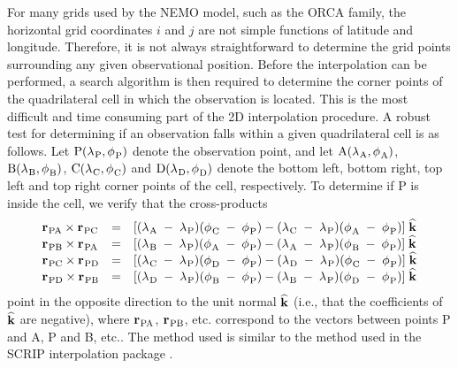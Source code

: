 \documentclass[NEMO_book]{subfiles}
\begin{document}
For many grids used by the NEMO model, such as the ORCA family, 
the horizontal grid coordinates $i$ and $j$ are not simple functions 
of latitude and longitude. Therefore, it is not always straightforward 
to determine the grid points surrounding any given observational position.
Before the interpolation can be performed, a search 
algorithm is then required to determine the corner points of 
the quadrilateral cell in which the observation is located.
This is the most difficult and time consuming part of the 
2D interpolation procedure. 
A robust test for determining if an observation falls
within a given quadrilateral cell is as follows. Let 
${\rm P}({\lambda_{}}_{\rm P} ,{\phi_{}}_{\rm P} )$ denote the observation point,
and let ${\rm A}({\lambda_{}}_{\rm A} ,{\phi_{}}_{\rm A} )$,
${\rm B}({\lambda_{}}_{\rm B} ,{\phi_{}}_{\rm B} )$,
${\rm C}({\lambda_{}}_{\rm C} ,{\phi_{}}_{\rm C} )$ 
and 
${\rm D}({\lambda_{}}_{\rm D} ,{\phi_{}}_{\rm D} )$ denote
the bottom left, bottom right, top left and top right
corner points of the cell, respectively. 
To determine if P is inside 
the cell, we verify that the cross-products 
\begin{eqnarray}
\begin{array}{lllll}
{{\bf r}_{}}_{\rm PA} \times {{\bf r}_{}}_{\rm PC}
& = & [({\lambda_{}}_{\rm A}\; -\; {\lambda_{}}_{\rm P} )
      ({\phi_{}}_{\rm C}   \; -\; {\phi_{}}_{\rm P} )
    - ({\lambda_{}}_{\rm C}\; -\; {\lambda_{}}_{\rm P} )
      ({\phi_{}}_{\rm A}   \; -\; {\phi_{}}_{\rm P} )] \; \widehat{\bf k} \\
{{\bf r}_{}}_{\rm PB} \times {{\bf r}_{}}_{\rm PA}
& = & [({\lambda_{}}_{\rm B}\; -\; {\lambda_{}}_{\rm P} )
      ({\phi_{}}_{\rm A}   \; -\; {\phi_{}}_{\rm P} )
    - ({\lambda_{}}_{\rm A}\; -\; {\lambda_{}}_{\rm P} )
      ({\phi_{}}_{\rm B}   \; -\; {\phi_{}}_{\rm P} )] \; \widehat{\bf k} \\
{{\bf r}_{}}_{\rm PC} \times {{\bf r}_{}}_{\rm PD}
& = & [({\lambda_{}}_{\rm C}\; -\; {\lambda_{}}_{\rm P} )
      ({\phi_{}}_{\rm D}   \; -\; {\phi_{}}_{\rm P} )
    - ({\lambda_{}}_{\rm D}\; -\; {\lambda_{}}_{\rm P} )
      ({\phi_{}}_{\rm C}   \; -\; {\phi_{}}_{\rm P} )] \; \widehat{\bf k} \\
{{\bf r}_{}}_{\rm PD} \times {{\bf r}_{}}_{\rm PB}
& = & [({\lambda_{}}_{\rm D}\; -\; {\lambda_{}}_{\rm P} )
      ({\phi_{}}_{\rm B}   \; -\; {\phi_{}}_{\rm P} )
    - ({\lambda_{}}_{\rm B}\; -\; {\lambda_{}}_{\rm P} )
      ({\phi_{}}_{\rm D}  \;  - \; {\phi_{}}_{\rm P} )] \; \widehat{\bf k} \\
\end{array}
\label{eq:cross}
\end{eqnarray}
point in the opposite direction to the unit normal 
$\widehat{\bf k}$ (i.e., that the coefficients of 
$\widehat{\bf k}$ are negative),
where ${{\bf r}_{}}_{\rm PA}$, ${{\bf r}_{}}_{\rm PB}$, 
etc. correspond to the vectors between points P and A, 
P and B, etc.. The method used is
similar to the method used in
the SCRIP interpolation package \citep{Jones_1998}.
\end{document}
